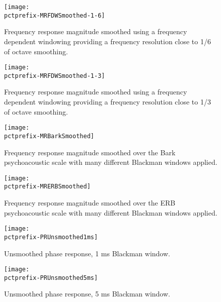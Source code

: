 \documentclass[a4paper,titlepage]{article}
\newcommand{\pctprefix}{T}
\newcommand{\pctwidth}{1.0}
\begin{document}
\begin{figure}
\begin{minipage}{\textwidth}
\begin{center}
\texttt{[image: \\pctprefix-MRFDWSmoothed-1-6]}
\caption{Frequency    response  magnitude   smoothed  using a  frequency
dependent  windowing providing  a frequency  resolution  close to 1/6 of
octave smoothing.}
\end{center}
\end{minipage}

\begin{minipage}{\textwidth}
\begin{center}
\texttt{[image: \\pctprefix-MRFDWSmoothed-1-3]}
\caption{Frequency    response  magnitude   smoothed  using a  frequency
dependent  windowing providing  a frequency  resolution  close to 1/3 of
octave smoothing.}
\end{center}
\end{minipage}
\end{figure}

\clearpage

\begin{figure}
\begin{minipage}{\textwidth}
\begin{center}
\texttt{[image: \\pctprefix-MRBarkSmoothed]}
\caption{Frequency response magnitude smoothed over the Bark 
psychoacoustic scale with many different Blackman windows applied.} 
\end{center}
\end{minipage}

\begin{minipage}{\textwidth}
\begin{center}
\texttt{[image: \\pctprefix-MRERBSmoothed]}
\caption{Frequency response magnitude smoothed over the ERB 
psychoacoustic scale with many different Blackman windows applied.} 
\end{center}
\end{minipage}
\end{figure}

\clearpage


\begin{figure}
\begin{minipage}{\textwidth}
\begin{center}
\texttt{[image: \\pctprefix-PRUnsmoothed1ms]}
\caption{Unsmoothed   phase response,  1 ms  Blackman window.}
\end{center}
\end{minipage}

\begin{minipage}{\textwidth}
\begin{center}
\texttt{[image: \\pctprefix-PRUnsmoothed5ms]}
\caption{Unsmoothed phase response,  5 ms Blackman window.}
\end{center}
\end{minipage}
\end{figure}
\end{document}
